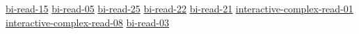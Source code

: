 \hyperref[sec:bi-read-15]{bi-read-15}
\hyperref[sec:bi-read-05]{bi-read-05}
\hyperref[sec:bi-read-25]{bi-read-25}
\hyperref[sec:bi-read-22]{bi-read-22}
\hyperref[sec:bi-read-21]{bi-read-21}
\hyperref[sec:interactive-complex-read-01]{interactive-complex-read-01}
\hyperref[sec:interactive-complex-read-08]{interactive-complex-read-08}
\hyperref[sec:bi-read-03]{bi-read-03}
